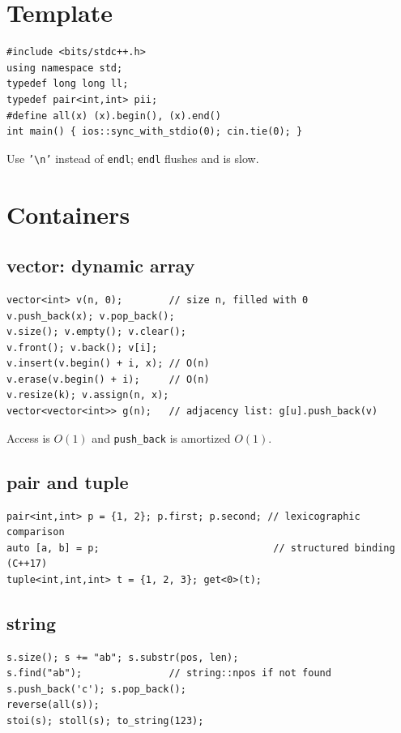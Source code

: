 \section{Template}

\begin{lstlisting}
#include <bits/stdc++.h>
using namespace std;
typedef long long ll;
typedef pair<int,int> pii;
#define all(x) (x).begin(), (x).end()
int main() { ios::sync_with_stdio(0); cin.tie(0); }
\end{lstlisting}

Use \texttt{'\textbackslash n'} instead of \texttt{endl}; \texttt{endl} flushes and is slow.

\section{Containers}

\subsection{vector: dynamic array}
\begin{lstlisting}
vector<int> v(n, 0);        // size n, filled with 0
v.push_back(x); v.pop_back();
v.size(); v.empty(); v.clear();
v.front(); v.back(); v[i];
v.insert(v.begin() + i, x); // O(n)
v.erase(v.begin() + i);     // O(n)
v.resize(k); v.assign(n, x);
vector<vector<int>> g(n);   // adjacency list: g[u].push_back(v)
\end{lstlisting}
Access is $O(1)$ and \texttt{push\_back} is amortized $O(1)$.

\subsection{pair and tuple}
\begin{lstlisting}
pair<int,int> p = {1, 2}; p.first; p.second; // lexicographic comparison
auto [a, b] = p;                              // structured binding (C++17)
tuple<int,int,int> t = {1, 2, 3}; get<0>(t);
\end{lstlisting}

\subsection{string}
\begin{lstlisting}
s.size(); s += "ab"; s.substr(pos, len);
s.find("ab");               // string::npos if not found
s.push_back('c'); s.pop_back();
reverse(all(s));
stoi(s); stoll(s); to_string(123);
\end{lstlisting}

